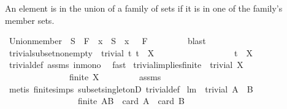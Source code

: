 \begin{isabellebody}
\begin{isamarkuptext}
An element is in the union of a family of sets if it is in one of the family's member sets.%
\end{isamarkuptext}%
\isamarkuptrue%
\isamarkupfalse%
\ Union{\isacharunderscore}member{\isacharcolon}\ {\isachardoublequoteopen}{\isacharparenleft}{\isasymexists}\ S\ {\isasymin}\ F\ {\isachardot}\ x\ {\isasymin}\ S{\isacharparenright}\ {\isasymlongleftrightarrow}\ x\ {\isasymin}\ {\isasymUnion}\ F{\isachardoublequoteclose}\ \isanewline
%
\isadelimproof
\ \ \ \ \ \ %
\endisadelimproof
%
\isatagproof
{}\isamarkupfalse%
\ blast%
\endisatagproof
{\isafoldproof}%
%
\isadelimproof
%
\endisadelimproof
%
\isamarkuptrue%
\isamarkupfalse%
\ trivial{\isacharunderscore}subset{\isacharunderscore}non{\isacharunderscore}empty{\isacharcolon}\ \ {\isachardoublequoteopen}trivial\ t{\isachardoublequoteclose}\ {\isachardoublequoteopen}t\ {\isasyminter}\ X\ {\isasymnoteq}\ {\isacharbraceleft}{\isacharbraceright}{\isachardoublequoteclose}\ \isanewline
\ \ \ \ \ \ \ \ \ \ \ \ \ \ \ {\isachardoublequoteopen}t\ {\isasymsubseteq}\ X{\isachardoublequoteclose}\ \isanewline
%
\isadelimproof
\ \ \ \ \ \ %
\endisadelimproof
%
\isatagproof
{}\isamarkupfalse%
\ trivial{\isacharunderscore}def\ assms\ in{\isacharunderscore}mono\ \isamarkupfalse%
\ fast%
\endisatagproof
{\isafoldproof}%
%
\isadelimproof
\isanewline
%
\endisadelimproof
\isanewline
{}\isamarkupfalse%
\ trivial{\isacharunderscore}implies{\isacharunderscore}finite{\isacharcolon}\ \ {\isachardoublequoteopen}trivial\ X{\isachardoublequoteclose}\ \isanewline
\ \ \ \ \ \ \ \ \ \ \ \ \ \ \ {\isachardoublequoteopen}finite\ X{\isachardoublequoteclose}\ \isanewline
%
\isadelimproof
\ \ \ \ \ \ %
\endisadelimproof
%
\isatagproof
{}\isamarkupfalse%
\ assms\ \isamarkupfalse%
\ {\isacharparenleft}metis\ finite{\isachardot}simps\ subset{\isacharunderscore}singletonD\ trivial{\isacharunderscore}def{\isacharparenright}%
\endisatagproof
{\isafoldproof}%
%
\isadelimproof
\isanewline
%
\endisadelimproof
\isanewline
\isanewline
{}\isamarkupfalse%
\ lm{}{}{\isacharcolon}\ \ {\isachardoublequoteopen}trivial\ {\isacharparenleft}A\ {\isasymtimes}\ B{\isacharparenright}{\isachardoublequoteclose}\ \isanewline
\ \ \ \ \ \ \ \ \ \ \ \ \ \ \ \ \ {\isachardoublequoteopen}{\isacharparenleft}finite\ {\isacharparenleft}A{\isasymtimes}B{\isacharparenright}\ {\isacharampersand}\ card\ A\ {\isacharasterisk}\ {\isacharparenleft}card\ B{\isacharparenright}\ {\isasymle}\ {}{\isacharparenright}{\isachardoublequoteclose}\ \isanewline

\end{isabellebody}
